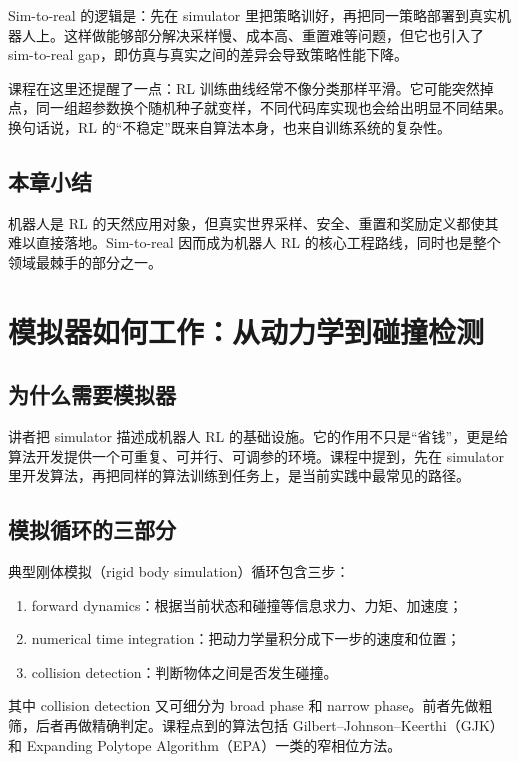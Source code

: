 \documentclass[a4paper]{article}
\begin{document}
Sim-to-real 的逻辑是：先在 simulator 里把策略训好，再把同一策略部署到真实机器人上。这样做能够部分解决采样慢、成本高、重置难等问题，但它也引入了 sim-to-real gap，即仿真与真实之间的差异会导致策略性能下降。

课程在这里还提醒了一点：RL 训练曲线经常不像分类那样平滑。它可能突然掉点，同一组超参数换个随机种子就变样，不同代码库实现也会给出明显不同结果。换句话说，RL 的“不稳定”既来自算法本身，也来自训练系统的复杂性。

\subsection{本章小结}

机器人是 RL 的天然应用对象，但真实世界采样、安全、重置和奖励定义都使其难以直接落地。Sim-to-real 因而成为机器人 RL 的核心工程路线，同时也是整个领域最棘手的部分之一。

\section{模拟器如何工作：从动力学到碰撞检测}

\subsection{为什么需要模拟器}

讲者把 simulator 描述成机器人 RL 的基础设施。它的作用不只是“省钱”，更是给算法开发提供一个可重复、可并行、可调参的环境。课程中提到，先在 simulator 里开发算法，再把同样的算法训练到任务上，是当前实践中最常见的路径。

\subsection{模拟循环的三部分}

典型刚体模拟（rigid body simulation）循环包含三步：
\begin{enumerate}
  \item forward dynamics：根据当前状态和碰撞等信息求力、力矩、加速度；
  \item numerical time integration：把动力学量积分成下一步的速度和位置；
  \item collision detection：判断物体之间是否发生碰撞。
\end{enumerate}

其中 collision detection 又可细分为 broad phase 和 narrow phase。前者先做粗筛，后者再做精确判定。课程点到的算法包括 Gilbert--Johnson--Keerthi（GJK）和 Expanding Polytope Algorithm（EPA）一类的窄相位方法。
\end{document}
